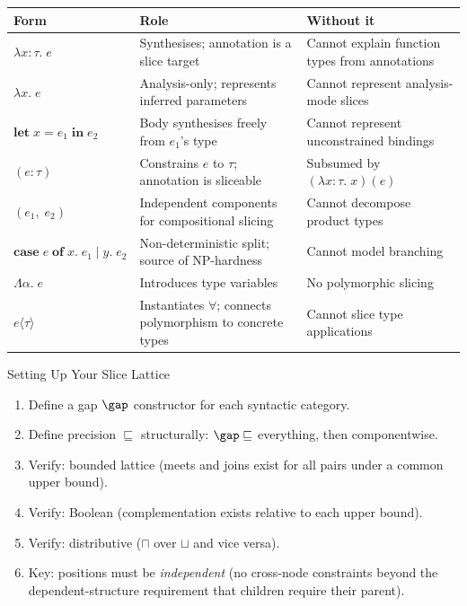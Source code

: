 \begin{center}
\small
\begin{tabular}{llp{6cm}}
\toprule
\textbf{Form} & \textbf{Role} & \textbf{Without it} \\
\midrule
$\lambda x \mathbin{:} \tau.\; e$ & Synthesises; annotation is a slice target & Cannot explain function types from annotations \\
$\lambda x.\; e$ & Analysis-only; represents inferred parameters & Cannot represent analysis-mode slices \\
$\mathbf{let}\;x = e_1\;\mathbf{in}\;e_2$ & Body synthesises freely from $e_1$'s type & Cannot represent unconstrained bindings \\
$(e : \tau)$ & Constrains $e$ to $\tau$; annotation is sliceable & Subsumed by $(\lambda x \mathbin{:} \tau.\;x)(e)$ \\
$(e_1,\; e_2)$ & Independent components for compositional slicing & Cannot decompose product types \\
$\mathbf{case}\;e\;\mathbf{of}\;x.\;e_1 \mid y.\;e_2$ & Non-deterministic split; source of NP-hardness & Cannot model branching \\
$\Lambda\alpha.\; e$ & Introduces type variables & No polymorphic slicing \\
$e\langle\tau\rangle$ & Instantiates $\forall$; connects polymorphism to concrete types & Cannot slice type applications \\
\bottomrule
\end{tabular}
\end{center}

\begin{recipe}{Setting Up Your Slice Lattice}
\begin{enumerate}
\item Define a gap $\gap$ constructor for each syntactic category.
\item Define precision $\sqsubseteq$ structurally: $\gap \sqsubseteq$ everything, then componentwise.
\item Verify: bounded lattice (meets and joins exist for all pairs under a common upper bound).
\item Verify: Boolean (complementation exists relative to each upper bound).
\item Verify: distributive ($\sqcap$ over $\sqcup$ and vice versa).
\item Key: positions must be \textit{independent} (no cross-node constraints beyond the dependent-structure requirement that children require their parent).
\end{enumerate}
\end{recipe}

